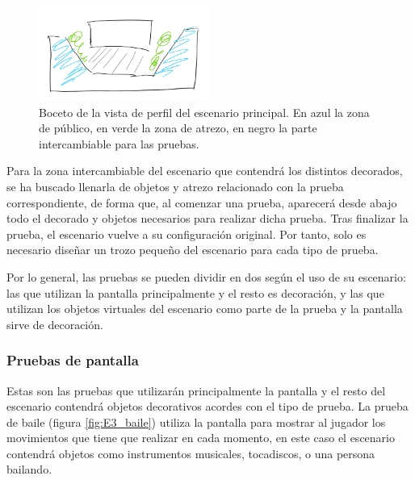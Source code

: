\begin{figure}
  \centering
    \includegraphics[width=0.5\textwidth]{04.Desarrollo/03.Entrega3/01.Iteracion3_1/00.Figuras/04.boceto_escenario_perfil.png}
    \caption{Boceto de la vista de perfil del escenario principal. En azul la zona de público, en verde la zona de atrezo, en negro la parte intercambiable para las pruebas.}
    \label{fig:E3_escenarioPerfil}
\end{figure}

Para la zona intercambiable del escenario que contendrá los distintos decorados, se ha buscado llenarla de objetos y atrezo relacionado con la prueba correspondiente, de forma que, al comenzar una prueba, aparecerá desde abajo todo el decorado y objetos necesarios para realizar dicha prueba. Tras finalizar la prueba, el escenario vuelve a su configuración original. Por tanto, solo es necesario diseñar un trozo pequeño del escenario para cada tipo de prueba.

Por lo general, las pruebas se pueden dividir en dos según el uso de su escenario: las que utilizan la pantalla principalmente y el resto es decoración, y las que utilizan los objetos virtuales del escenario como parte de la prueba y la pantalla sirve de decoración.


\subsubsection{Pruebas de pantalla}

Estas son las pruebas que utilizarán principalmente la pantalla y el resto del escenario contendrá objetos decorativos acordes con el tipo de prueba. La prueba de baile (figura \ref{fig:E3_baile}) utiliza la pantalla para mostrar al jugador los movimientos que tiene que realizar en cada momento, en este caso el escenario contendrá objetos como instrumentos musicales, tocadiscos, o una persona bailando.

